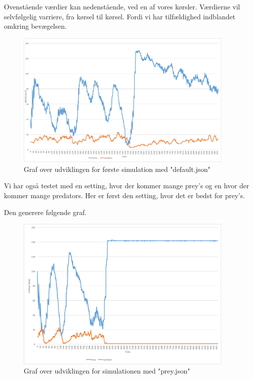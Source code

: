 \documentclass[a4paper]{article}
\begin{document}
    Ovenstående værdier kan nedenstående, ved en af vores kørsler.
    Værdierne vil selvfølgelig varriere, fra kørsel til kørsel. Fordi vi har tilfældighed indblandet omkring bevægelsen.

    \begin{figure}[H]
      \centering
      \includegraphics[width=400px]{figures/1sim.png}
      \caption{Graf over udviklingen for første simulation med "default.json"}
      \label{fig:firstSimulation}
    \end{figure}

    Vi har også testet med en setting, hvor der kommer mange prey's og en hvor der kommer mange predators.
    Her er først den setting, hvor det er bedst for prey's.
    

    Den generere følgende graf.
    \begin{figure}[H]
      \centering
      \includegraphics[width=400px]{figures/2sim.png}
      \caption{Graf over udviklingen for simulationen med "prey.json"}
      \label{fig:secondSimulation}
    \end{figure}
\end{document}
